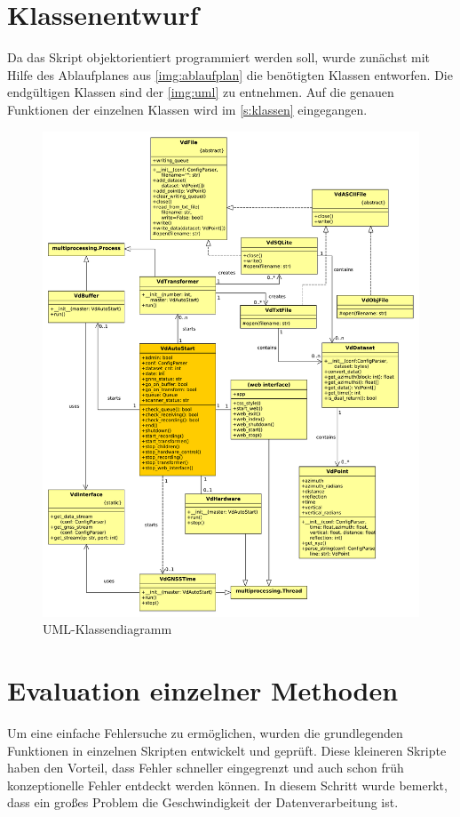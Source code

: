 \documentclass[a4paper,12pt,bibliography=totoc, listof=totoc,titlepage,pointlessnumbers]{scrreprt}
\begin{document}
\section{Klassenentwurf}
Da das Skript objektorientiert programmiert werden soll, wurde zunächst mit Hilfe des Ablaufplanes aus \autoref{img:ablaufplan} die benötigten Klassen entworfen. Die endgültigen Klassen sind der \autoref{img:uml} zu entnehmen. Auf die genauen Funktionen der einzelnen Klassen wird im \autoref{s:klassen} eingegangen.

\begin{figure}
 \centering
 \includegraphics[width=1\textwidth]{./img/UML.pdf}
 \caption{UML-Klassendiagramm}
 \label{img:uml}
\end{figure}

\section{Evaluation einzelner Methoden}
Um eine einfache Fehlersuche zu ermöglichen, wurden die grundlegenden Funktionen in einzelnen Skripten entwickelt und geprüft. Diese kleineren Skripte haben den Vorteil, dass Fehler schneller eingegrenzt und auch schon früh konzeptionelle Fehler entdeckt werden können. In diesem Schritt wurde bemerkt, dass ein großes Problem die Geschwindigkeit der Datenverarbeitung ist. 
\end{document}
